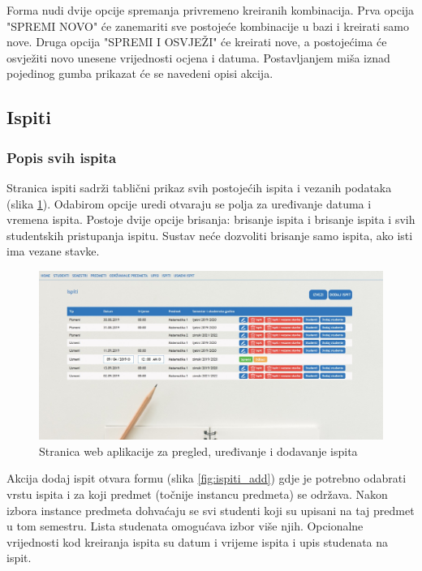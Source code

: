 \documentclass[times, utf8, diplomski]{fer}
\begin{document}
\hfill\break
Forma nudi dvije opcije spremanja privremeno kreiranih kombinacija. Prva opcija "SPREMI NOVO" će zanemariti sve postojeće kombinacije u bazi i kreirati samo nove. Druga opcija "SPREMI I OSVJEŽI" će kreirati nove, a postojećima će osvježiti novo unesene vrijednosti ocjena i datuma. Postavljanjem miša iznad pojedinog gumba prikazat će se navedeni opisi akcija.



\subsection{Ispiti}
\subsubsection{Popis svih ispita}
Stranica ispiti sadrži tablični prikaz svih postojećih ispita i vezanih podataka (slika \ref{fig:ispiti}). Odabirom opcije uredi otvaraju se polja za uređivanje datuma i vremena ispita.
Postoje dvije opcije brisanja: brisanje ispita i brisanje ispita i svih studentskih pristupanja ispitu. Sustav neće dozvoliti brisanje samo ispita, ako isti ima vezane stavke.

\begin{figure}[htb]
\centering
\includegraphics[width=14cm]{ispiti.jpg}
\caption{Stranica web aplikacije za pregled, uređivanje i dodavanje ispita }
\label{fig:ispiti}
\end{figure}

Akcija dodaj ispit otvara formu (slika \ref{fig:ispiti_add})  gdje je potrebno odabrati vrstu ispita i za koji predmet (točnije instancu predmeta) se održava. Nakon izbora instance predmeta dohvaćaju se svi studenti koji su upisani na taj predmet u tom semestru. Lista studenata omogućava izbor više njih. Opcionalne vrijednosti kod kreiranja ispita su datum i vrijeme ispita i upis studenata na ispit.
\end{document}
